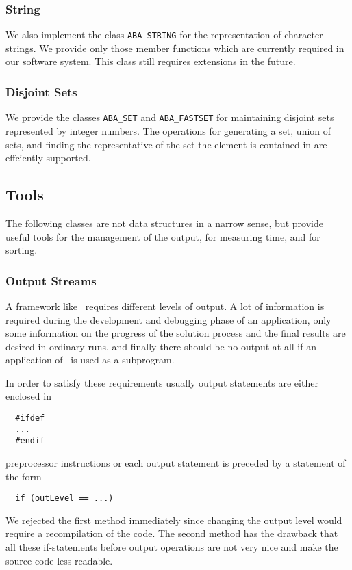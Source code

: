 \subsubsection{String}

We also implement the class {\tt ABA\_STRING} for 
the representation of 
character strings. We provide only those member functions which are
currently required in our software system. This class still requires
extensions in the future.

\subsubsection{Disjoint Sets}
\noindent
We provide the classes {\tt ABA\_SET} and 
{\tt ABA\_FASTSET} for maintaining disjoint sets represented by
integer numbers. The operations for generating a set, union of sets, and finding
the representative of the set the element is contained in are effciently 
supported.

\subsection{Tools}
\noindent
The following classes are not data structures in a narrow sense, but 
provide useful tools for the management of the output, for measuring time,
and for sorting.

\subsubsection{Output Streams}
\noindent
A framework like \ABACUS\ requires different levels of output. 
A lot of information is required during the development and debugging
phase of an application, only some information on the progress of the
solution process and the final results are desired in ordinary runs,
and finally there should be no output at all if an application of
\ABACUS\ is used as a subprogram.

In order to satisfy these requirements usually output statements are either
enclosed in 
\begin{verbatim}
  #ifdef 
  ...
  #endif
\end{verbatim}
preprocessor instructions
or each output statement is preceded by a statement of the 
form 
\begin{verbatim}
  if (outLevel == ...)
\end{verbatim}
We rejected the first method
immediately since changing the output level would require a 
recompilation of the code. The second method has the drawback
that all these if-statements before output operations are not
very nice and make the source code less readable.

